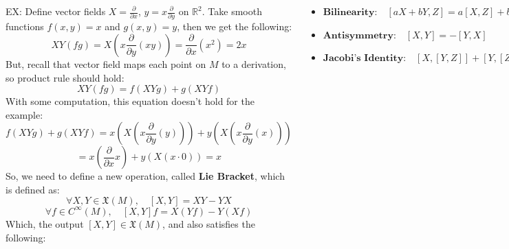 \documentclass[20pt,,margin=1in,innermargin=-4.5in,blockverticalspace=-0.25in]{tikzposter}
\begin{document}
\begin{columns}
{        EX: Define vector fields $X=\frac{\partial}{\partial x}$, $y=x\frac{\partial}{\partial y}$ on $\mathbb{R}^2$. Take smooth functions $f(x,y)=x$ and $g(x,y)=y$, then we get the following:
        $$XY(fg) = X(x\frac{\partial}{\partial y}(xy)) = \frac{\partial}{\partial x}(x^2) = 2x$$
        But, recall that vector field maps each point on $M$ to a derivation, so product rule should hold:
        $$XY(fg) = f(XY g) + g(XY f)$$
        With some computation, this equation doesn't hold for the example:
        $$f(XY g)+g(XY f)=x(X(x\frac{\partial}{\partial y}(y))) + y(X(x\frac{\partial}{\partial y}(x)))$$
        $$ = x(\frac{\partial}{\partial x}x)+y(X(x\cdot 0)) = x$$
        So, we need to define a new operation, called \textbf{Lie Bracket}, which is defined as:
        $$\forall X,Y\in\mathfrak{X}(M),\quad [X,Y]=XY-YX$$
        $$\forall f\in C^\infty(M),\quad [X,Y]f = X(Yf)-Y(Xf)$$
        Which, the output $[X,Y]\in\mathfrak{X}(M)$, and also satisfies the following:
        \begin{center}
            \begin{itemize}
                \item $\textbf{Bilinearity:}\quad [aX+bY,Z]=a[X,Z]+b[Y,Z]$
                \item $\textbf{Antisymmetry:}\quad [X,Y]=-[Y,X]$
                \item $\textbf{Jacobi's Identity:}\quad \left[X,[Y,Z]\right]+ \left[Y,[Z,X]\right]+ \left[Z,[X,Y]\right]=0$
            \end{itemize}
        \end{center}
        Moreover, given smooth map $F:M\rightarrow N$, if $X_1,X_2\in\mathfrak{X}(M)$ and $Y_1,Y_2\in\mathfrak{X}(N)$ are $F$-related respectively, then $[X_1,X_2]\in \mathfrak{X}(M)$ and $[Y_1,Y_2]\in\mathfrak{X}(N)$ are also $F$-related. This is the essential tool for defining Lie Algebra on a Lie Group.
    }
\end{columns}
\end{document}

